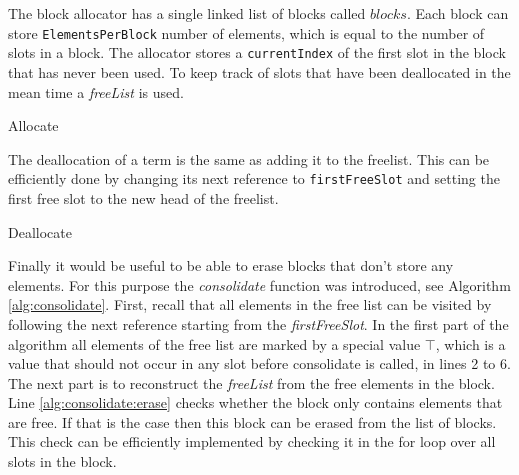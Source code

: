 \documentclass[10pt,a4paper]{article}
\begin{document}
The block allocator has a single linked list of blocks called $blocks$.
Each block can store \texttt{ElementsPerBlock} number of elements, which is equal to the number of slots in a block.
The allocator stores a \texttt{currentIndex} of the first slot in the block that has never been used.
To keep track of slots that have been deallocated in the mean time a \emph{freeList} is used.

\begin{algorithm}[H]
  \caption{Allocate}\label{alg:allocate}
  \begin{algorithmic}[1]
    \EndIf
    
    \EndIf  
    
    \EndProcedure
  \end{algorithmic}
\end{algorithm}

\noindent The deallocation of a term is the same as adding it to the freelist.
This can be efficiently done by changing its next reference to \texttt{firstFreeSlot} and setting the first free slot to the new head of the freelist.

\begin{algorithm}[H]
  \caption{Deallocate}\label{alg:deallocate}
  \begin{algorithmic}[1]
    \EndProcedure
  \end{algorithmic}
\end{algorithm}

\noindent Finally it would be useful to be able to erase blocks that don't store any elements.
For this purpose the \emph{consolidate} function was introduced, see Algorithm \ref{alg:consolidate}.
First, recall that all elements in the free list can be visited by following the next reference starting from the \emph{firstFreeSlot}.
In the first part of the algorithm all elements of the free list are marked by a special value $\top$, which is a value that should not occur in any slot before consolidate is called, in lines 2 to 6.
The next part is to reconstruct the \emph{freeList} from the free elements in the block.
Line \ref{alg:consolidate:erase} checks whether the block only contains elements that are free.
If that is the case then this block can be erased from the list of blocks. 
This check can be efficiently implemented by checking it in the for loop over all slots in the block.
\end{document}
